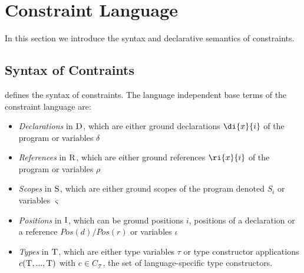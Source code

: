 \section{Constraint Language}

\newcommand{\sort}[1]{\text{\sc #1}}

In this section we introduce the syntax and declarative semantics of
constraints.

\subsection{Syntax of Contraints}

 defines the syntax of constraints.
The language independent base terms of the constraint language are:
\begin{itemize}
 \item \emph{Declarations} in $\sort{D}$, which are either ground declarations
 $\di{x}{i}$ of the  program or variables $\delta$
 \item \emph{References} in $\sort{R}$, which are either ground references
 $\ri{x}{i}$ of the program  or variables $\rho$
 \item \emph{Scopes} in $\sort{S}$, which are either ground scopes of the
 program denoted $S_i$ or variables $\varsigma$
 \item \emph{Positions} in $\sort{I}$, which can be ground positions $i$,
 positions of a declaration  or a reference $Pos(d)/Pos(r)$ or variables $\iota$
 \item \emph{Types} in $\sort{T}$, which are either type variables $\tau$ or
 type constructor applications $c({\sort{T},...,\sort{T}})$ with $c \in
 C_{\mathcal{T}}$, the set of language-specific type constructors. 
\end{itemize}


